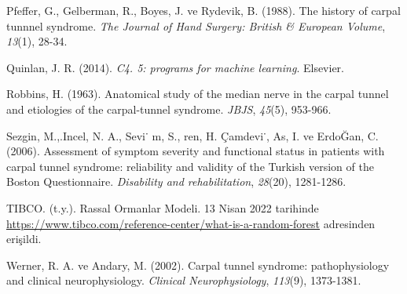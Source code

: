 \documentclass[12pt,twoside]{deuthesis}
\begin{document}
\begin{CSLReferences}{1}{0}
\leavevmode{}%
Pfeffer, G., Gelberman, R., Boyes, J. ve Rydevik, B. (1988). The history of carpal tunnnel syndrome. \emph{The Journal of Hand Surgery: British \& European Volume}, \emph{13}(1), 28-34.

\leavevmode{}%
Quinlan, J. R. (2014). \emph{C4. 5: programs for machine learning}. Elsevier.

\leavevmode{}%
Robbins, H. (1963). Anatomical study of the median nerve in the carpal tunnel and etiologies of the carpal-tunnel syndrome. \emph{JBJS}, \emph{45}(5), 953-966.

\leavevmode{}%
Sezgin, M.,.Incel, N. A., Sevi˙ m, S., ren, H. Çamdevi˙, As, I. ve ErdoĞan, C. (2006). Assessment of symptom severity and functional status in patients with carpal tunnel syndrome: reliability and validity of the Turkish version of the Boston Questionnaire. \emph{Disability and rehabilitation}, \emph{28}(20), 1281-1286.

\leavevmode{}%
TIBCO. (t.y.). Rassal Ormanlar Modeli. 13 Nisan 2022 tarihinde \url{https://www.tibco.com/reference-center/what-is-a-random-forest} adresinden erişildi.

\leavevmode{}%
Werner, R. A. ve Andary, M. (2002). Carpal tunnel syndrome: pathophysiology and clinical neurophysiology. \emph{Clinical Neurophysiology}, \emph{113}(9), 1373-1381.

\end{CSLReferences}
\setlength{\parindent}{-0.20in}
\setlength{\leftskip}{0.20in}
\setlength{\parskip}{8pt}

\appendix
\end{document}
